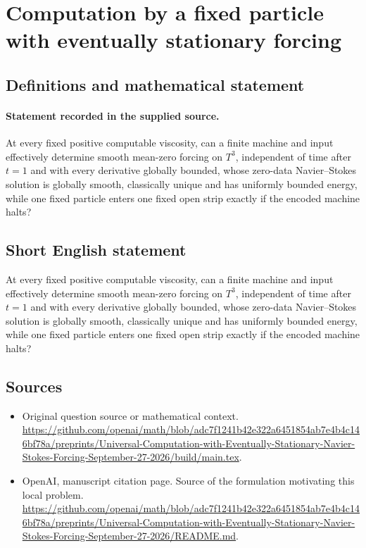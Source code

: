 \documentclass[11pt]{article}
\begin{document}
\section*{Computation by a fixed particle with eventually stationary forcing}\label{statement}
\subsection{Definitions and mathematical statement}
\paragraph{Statement recorded in the supplied source.}
At every fixed positive computable viscosity, can a finite machine and input effectively determine smooth mean-zero forcing on $T^3$, independent of time after $t=1$ and with every derivative globally bounded, whose zero-data Navier–Stokes solution is globally smooth, classically unique and has uniformly bounded energy, while one fixed particle enters one fixed open strip exactly if the encoded machine halts?
\subsection{Short English statement}
At every fixed positive computable viscosity, can a finite machine and input effectively determine smooth mean-zero forcing on $T^3$, independent of time after $t=1$ and with every derivative globally bounded, whose zero-data Navier–Stokes solution is globally smooth, classically unique and has uniformly bounded energy, while one fixed particle enters one fixed open strip exactly if the encoded machine halts?
\subsection{Sources}
\begin{itemize}
\item[S1] Original question source or mathematical context.
\url{https://github.com/openai/math/blob/adc7f1241b42e322a6451854ab7e4b4c146bf78a/preprints/Universal-Computation-with-Eventually-Stationary-Navier-Stokes-Forcing-September-27-2026/build/main.tex}.
\item[S2] OpenAI, manuscript citation page. Source of the formulation motivating this local problem.
\url{https://github.com/openai/math/blob/adc7f1241b42e322a6451854ab7e4b4c146bf78a/preprints/Universal-Computation-with-Eventually-Stationary-Navier-Stokes-Forcing-September-27-2026/README.md}.
\end{itemize}
\end{document}
